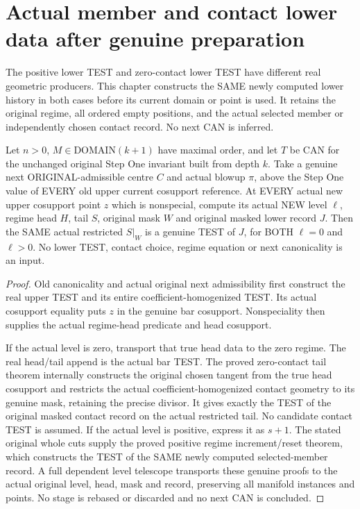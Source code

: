 \section{Actual member and contact lower data after genuine preparation}

The positive lower TEST and zero-contact lower TEST have different real
geometric producers. This chapter constructs the SAME newly computed lower
history in both cases before its current domain or point is used. It retains
the original regime, all ordered empty positions, and the actual selected
member or independently chosen contact record. No next CAN is inferred.

\begin{theorem}
\label{hir:original-prepared-current-all-branches-lower-test}
\leanok
Let $n>0$, $M\in\mathrm{DOMAIN}(k+1)$ have maximal order, and let $T$ be
CAN for the unchanged original Step One invariant built from depth $k$.
Take a genuine next ORIGINAL-admissible centre $C$ and actual blowup $\pi$,
above the Step One value of EVERY old upper current cosupport reference.
At EVERY actual new upper cosupport point $z$ which is nonspecial, compute
its actual NEW level $\ell$, regime head $H$, tail $S$, original mask $W$
and original masked lower record $J$. Then the SAME actual restricted $S|_W$
is a genuine TEST of $J$, for BOTH $\ell=0$ and $\ell>0$. No lower TEST,
contact choice, regime equation or next canonicality is an input.
\end{theorem}
\begin{proof}
Old canonicality and actual original next admissibility first construct the
real upper TEST and its entire coefficient-homogenized TEST. Its actual
cosupport equality puts $z$ in the genuine bar cosupport. Nonspeciality
then supplies the actual regime-head predicate and head cosupport.

If the actual level is zero, transport that true head data to the zero
regime. The real head/tail append is the actual bar TEST. The proved
zero-contact tail theorem internally constructs the original chosen tangent
from the true head cosupport and restricts the actual coefficient-homogenized
contact geometry to its genuine mask, retaining the precise divisor.
It gives exactly the TEST of the original masked contact record on the
actual restricted tail. No candidate contact TEST is assumed. If the actual
level is positive, express it as $s+1$. The stated original whole cuts supply
the proved positive regime increment/reset theorem, which constructs the
TEST of the SAME newly computed selected-member record. A full dependent
level telescope transports these genuine proofs to the actual original
level, head, mask and record, preserving all manifold instances and points.
No stage is rebased or discarded and no next CAN is concluded.
\end{proof}

